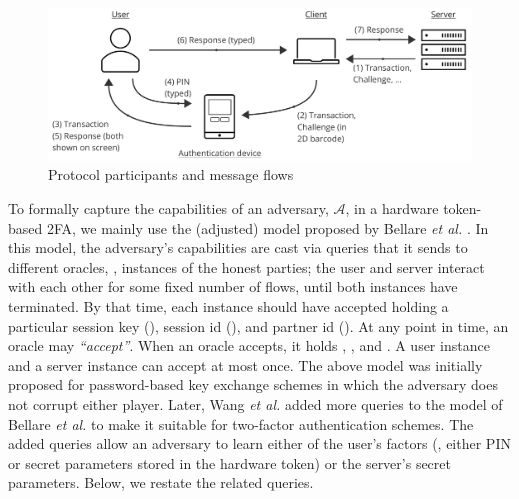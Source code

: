 \begin{figure}
\begin{centering}
\includegraphics[width=12cm]{setup}
\end{centering}
\caption{\label{fig:setup.}Protocol participants and message flows}
\end{figure}
\vspace{-5mm}
%
To formally capture the capabilities of an adversary, $\mathcal{A}$, in a hardware token-based 2FA,  we mainly use the (adjusted) model proposed by Bellare \textit{et al.} \cite{BellarePR00}. In this model, the adversary’s capabilities are cast via queries that it sends to different oracles, \ie, instances of the honest parties; the user and server interact with each other for some fixed number of flows, until both instances have terminated. By that time, each instance should have accepted holding a particular session key (\seckey), session id (\SID), and partner id (\PID). At any point in time, an oracle may \emph{``accept''}. When an oracle accepts, it holds \seckey, \SID, and \PID. A user instance and a server instance can accept at most once. The above model was initially proposed for password-based key exchange schemes in which the adversary does not corrupt either player.  Later, Wang \textit{et al.} \cite{WangW18}  added more queries to the model of  Bellare \textit{et al.} to make it suitable for two-factor authentication schemes. The added queries allow an adversary to learn either of the user's factors (\ie, either PIN or secret parameters stored in the hardware token) or the server's secret parameters.  Below, we restate the related queries. 
 





